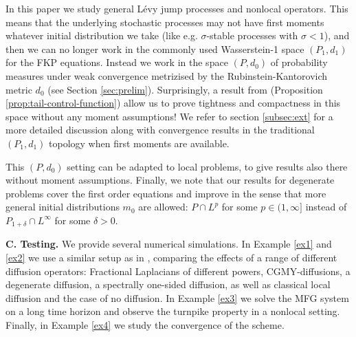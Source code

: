 \documentclass[a4paper,  twoside, 10pt, leqno]{amsart}
\theoremstyle{remark}
\theoremstyle{definition}
\begin{document}

In this paper we study general L\'evy jump processes and nonlocal
operators. This means that the underlying stochastic processes may not
have first moments whatever initial distribution we take (like
e.g. $\sigma$-stable processes with $\sigma<1$), and then we can no
longer work in the commonly used Wasserstein-1 space $(P_1,d_1)$ for
the FKP equations. Instead we work in the space $(P,d_0)$ of
probability measures under weak convergence metrizised by the
Rubinstein-Kantorovich metric $d_0$ (see Section
\ref{sec:prelim}). Surprisingly, a result from
\cite{Espen-Indra-Milosz-2020} (Proposition
\ref{prop:tail-control-function}) allow us to prove tightness and compactness in this space without any moment assumptions! We refer to section \ref{subsec:ext} for a more detailed discussion along with convergence results in the traditional $(P_1,d_1)$ topology when first moments are available.

This $(P,d_0)$ setting can be adapted to local problems, to give results
also there without moment assumptions. Finally, we note that our results for degenerate
problems cover the first order equations and improve
\cite{carliniSilva2014semi1st} in the sense that more general initial
distributions $m_0$ are allowed: $P\cap L^p$ for some $p\in(1,\infty]$
  instead of $P_{1+\delta}\cap L^\infty$ for some $\delta>0$. 
  
\smallskip

{\bf C. Testing.} We provide several numerical simulations. In Example \ref{ex1} and \ref{ex2} we use a similar setup as in
\cite{carlini2015semi},
comparing the effects of a range of different diffusion operators: Fractional Laplacians of different powers, 
CGMY-diffusions, 
a degenerate diffusion, a spectrally one-sided diffusion, as well as classical local diffusion and the case of no diffusion.
In Example \ref{ex3} we solve the MFG system on a long time horizon and observe the turnpike property in a nonlocal setting. Finally, in Example \ref{ex4} we study the convergence of the scheme. 
\end{document}
